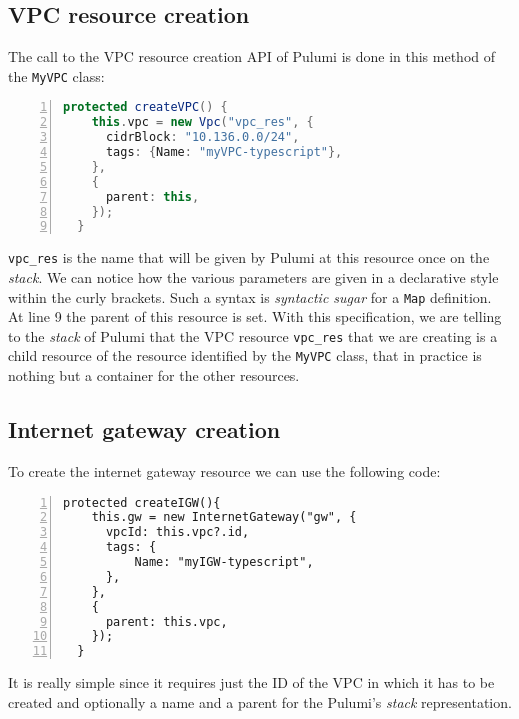 \subsection{VPC resource creation}
The call to the VPC resource creation API of Pulumi is done in this method of the \texttt{MyVPC} class:\\
\begin{minipage}{\linewidth}
\begin{lstlisting}[language=scala, numbers=left, numberstyle=\tiny, numbersep=-5pt, stepnumber=1]
  protected createVPC() {
    this.vpc = new Vpc("vpc_res", {
      cidrBlock: "10.136.0.0/24",
      tags: {Name: "myVPC-typescript"},
    },
    {
      parent: this,
    });
  }
\end{lstlisting}
\end{minipage}
\texttt{vpc\_res} is the name that will be given by Pulumi at this resource once on the \textit{stack}.
We can notice how the various parameters are given in a declarative style within the curly brackets.
Such a syntax is \textit{syntactic sugar} for a \texttt{Map} definition.\\
At line 9 the parent of this resource is set.
With this specification, we are telling to the \textit{stack} of Pulumi that the VPC resource \texttt{vpc\_res} that we are creating is a child resource of the resource identified by the \texttt{MyVPC} class, that in practice is nothing but a container for the other resources.

\subsection{Internet gateway creation}
To create the internet gateway resource we can use the following code:\\
\begin{minipage}{\linewidth}
\begin{lstlisting}[numbers=left, numberstyle=\tiny, numbersep=-5pt, stepnumber=1]
  protected createIGW(){
    this.gw = new InternetGateway("gw", {
      vpcId: this.vpc?.id,
      tags: {
          Name: "myIGW-typescript",
      },
    },
    {
      parent: this.vpc,
    });
  }
\end{lstlisting}
\end{minipage}
It is really simple since it requires just the ID of the VPC in which it has to be created and optionally a name and a parent for the Pulumi's \textit{stack} representation.


